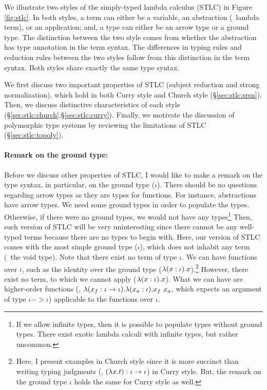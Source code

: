 We illustrate two styles of the simply-typed lambda calculus (STLC)
in Figure \ref{fig:stlc}. In both styles, a term can either be a variable,
an abstraction (\aka\ lambda term), or an application; and, a type can
either be an arrow type or a ground type. The distinction between
the two style comes from whether the abstraction has type annotation
in the term syntax. The differences in typing rules and reduction rules
between the two styles follow from this distinction in the term syntax.
Both styles share exactly the same type syntax.

We first discuss two important properties of STLC
(subject reduction and strong normalization), which hold
in both Curry style and Church style (\S\ref{sec:stlc:srsn}).
Then, we discuss distinctive characteristics of each style
(\S\ref{sec:stlc:church},\S\ref{sec:stlc:curry}).
Finally, we motivate the discussion of polymorphic type systems
by reviewing the limitations of STLC (\S\ref{sec:stlc:topoly}).

\paragraph{Remark on the ground type:}
Before we discuss other properties of STLC, I would like to make a remark on
the type syntax, in particular, on the ground type ($\iota$). There should be
no questions regarding arrow types as they are types for functions.
For instance, abstractions have arrow types. We need some ground types
in order to populate the types. Otherwise, if there were no ground types,
we would not have any types\footnote{If we allow infinite types,
	then it is possible to populate types without ground types.
	There exist exotic lambda calculi with infinite types, but
	rather uncommon.}
Then, such version of STLC will be very uninteresting since there cannot
be any well-typed terms because there are no types to begin with. Here,
our version of STLC comes with the most simple ground type ($\iota$),
which does not inhabit any term (\aka\ the void type). Note that there exist
no term of type $\iota$. We can have functions over $\iota$, such as
the identity over the ground type ($\lambda(x:\iota).x$).\footnote{Here,
	I present examples in Church style since it is more succinct than
	writing typing judgments (\eg, $(\lambda x.t) : \iota -> \iota$)
	in Curry style.  But, the remark on the ground type $\iota$
	holds the same for Curry style as well.}
However, there exist no term, to which we cannot apply ($\lambda(x:\iota).x$).
What we can have are higher-order functions
(\eg, $\lambda(x_{f}:\iota -> \iota).\lambda(x_a:\iota).x_f~x_a$, which expects
an argument of type $\iota -> \iota$) applicable to the functions over $\iota$.

